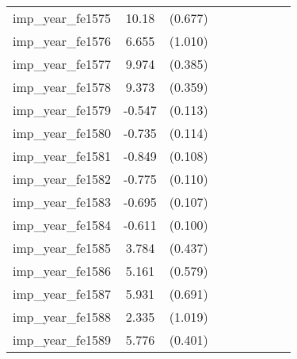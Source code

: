 {\begin{tabular}{l*{4}{cc}}
imp\_year\_fe1575&    10.18\sym{***}&  (0.677)&                  &         &                  &         &                  &         \\
imp\_year\_fe1576&    6.655\sym{***}&  (1.010)&                  &         &                  &         &                  &         \\
imp\_year\_fe1577&    9.974\sym{***}&  (0.385)&                  &         &                  &         &                  &         \\
imp\_year\_fe1578&    9.373\sym{***}&  (0.359)&                  &         &                  &         &                  &         \\
imp\_year\_fe1579&   -0.547\sym{***}&  (0.113)&                  &         &                  &         &                  &         \\
imp\_year\_fe1580&   -0.735\sym{***}&  (0.114)&                  &         &                  &         &                  &         \\
imp\_year\_fe1581&   -0.849\sym{***}&  (0.108)&                  &         &                  &         &                  &         \\
imp\_year\_fe1582&   -0.775\sym{***}&  (0.110)&                  &         &                  &         &                  &         \\
imp\_year\_fe1583&   -0.695\sym{***}&  (0.107)&                  &         &                  &         &                  &         \\
imp\_year\_fe1584&   -0.611\sym{***}&  (0.100)&                  &         &                  &         &                  &         \\
imp\_year\_fe1585&    3.784\sym{***}&  (0.437)&                  &         &                  &         &                  &         \\
imp\_year\_fe1586&    5.161\sym{***}&  (0.579)&                  &         &                  &         &                  &         \\
imp\_year\_fe1587&    5.931\sym{***}&  (0.691)&                  &         &                  &         &                  &         \\
imp\_year\_fe1588&    2.335\sym{*}  &  (1.019)&                  &         &                  &         &                  &         \\
imp\_year\_fe1589&    5.776\sym{***}&  (0.401)&                  &         &                  &         &                  &         \\

\end{tabular}}
